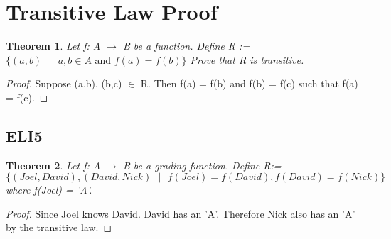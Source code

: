 \section{Transitive Law Proof}
\newtheorem{theorem}{Theorem}
\renewcommand\qedsymbol{QED}
\begin{theorem}
Let f: A $\rightarrow$ B be a function. \vskip 0.1cm \noindent
Define R := $\{(a,b) \textrm{ $|$ } a,b \in A \textrm{ and } f(a) = f(b) \}$ Prove that R is transitive.
\end{theorem}

\begin{proof}
	Suppose (a,b), (b,c) $\in$ R. Then f(a) = f(b) and f(b) = f(c) such
	that f(a) = f(c). 
\end{proof}

\subsection{ELI5}
\begin{theorem}
Let f: A $\rightarrow$ B be a grading function.\vskip 0.1cm \noindent
Define R:= $\{(Joel, David), (David,Nick) \textrm{ $|$ } f(Joel) =
	f(David), f(David) = f(Nick)\}$ where f(Joel) = 'A'.
\end{theorem}

\begin{proof}
Since Joel knows David. David has an 'A'. Therefore Nick also has an 'A' by the
transitive law.
\end{proof}
